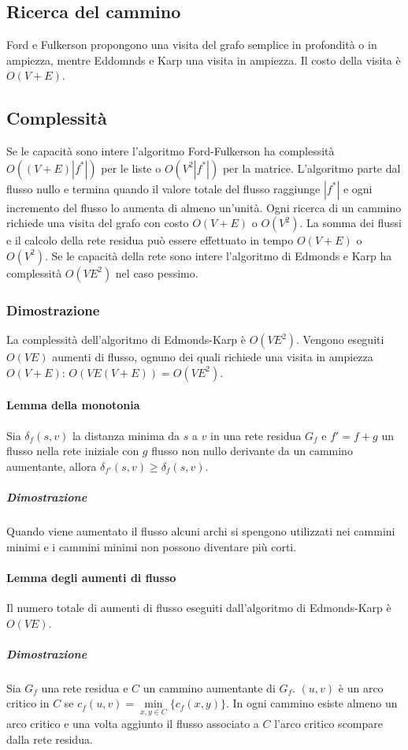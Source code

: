 \subsection{Ricerca del cammino}
Ford e Fulkerson propongono una visita del grafo semplice in profondit\`a o in ampiezza, mentre Eddomnds e Karp una visita in ampiezza. Il costo della visita \`e $O(V+E)$.
\subsection{Complessit\`a}
Se le capacit\`a sono intere l'algoritmo Ford-Fulkerson ha complessit\`a $O((V+E)|f^*|)$ per le liste o $O(V^2|f^*|)$ per la matrice. L'algoritmo parte dal flusso nullo e termina quando
il valore totale del flusso raggiunge $|f^*|$ e ogni incremento del flusso lo aumenta di almeno un'unit\`a. Ogni ricerca di un cammino richiede una visita del grafo con costo
$O(V+E)$ o $O(V^2)$. La somma dei flussi e il calcolo della rete residua pu\`o essere effettuato in tempo $O(V+E)$ o $O(V^2)$. Se le capacit\`a della rete sono intere l'algoritmo di 
Edmonds e Karp ha complessit\`a $O(VE^2)$ nel caso pessimo. 
\subsubsection{Dimostrazione}
La complessit\`a dell'algoritmo di Edmonds-Karp \`e $O(VE^2)$. Vengono eseguiti $O(VE)$ aumenti di flusso, ognuno dei quali richiede una visita in ampiezza $O(V+E)$: 
$O(VE(V+E))=O(VE^2)$.
\paragraph{Lemma della monotonia}
Sia $\delta_f(s, v)$ la distanza minima da $s$ a $v$ in una rete residua $G_f$ e $f' = f+g$ un flusso nella rete iniziale con $g$ flusso non nullo derivante da un cammino aumentante, 
allora $\delta_{f'}(s, v)\ge \delta_f(s, v)$. 
\subparagraph{Dimostrazione}
Quando viene aumentato il flusso alcuni archi si spengono utilizzati nei cammini minimi e i cammini minimi non possono diventare pi\`u corti. 
\paragraph{Lemma degli aumenti di flusso}
Il numero totale di aumenti di flusso eseguiti dall'algoritmo di Edmonds-Karp \`e $O(VE)$. 
\subparagraph{Dimostrazione}
Sia $G_f$ una rete residua e $C$ un cammino aumentante di $G_f$. $(u, v)$ \`e un arco critico in $C$ se $c_f(u, v) = \min\limits_{x, y\in C}\{c_f(x, y)\}$. In ogni cammino esiste almeno
un arco critico e una volta aggiunto il flusso associato a $C$ l'arco critico scompare dalla rete residua. 

